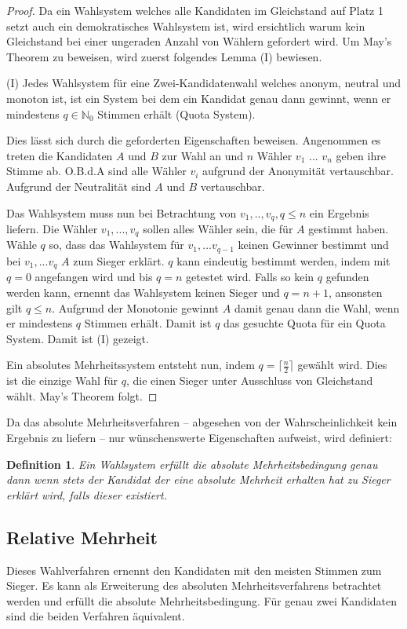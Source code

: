 \documentclass[BCOR5mm,DIV12,a4paper,10pt]{scrartcl}
\newtheorem{definition}[lemma]{Definition} %
\begin{document}
\begin{proof}
Da ein Wahlsystem welches alle Kandidaten im Gleichstand auf Platz 1 setzt auch ein demokratisches Wahlsystem ist, wird ersichtlich warum kein Gleichstand bei einer ungeraden Anzahl von Wählern gefordert wird. Um May's Theorem zu beweisen, wird zuerst folgendes Lemma (I) bewiesen.


(I) Jedes Wahlsystem für eine Zwei-Kandidatenwahl welches anonym, neutral und monoton ist, ist ein System bei dem ein Kandidat genau dann gewinnt, wenn er mindestens $q \in \mathbb{N}_0$ Stimmen erhält (Quota System).

Dies lässt sich durch die geforderten Eigenschaften beweisen. Angenommen es treten die Kandidaten $A$ und $B$ zur Wahl an und $n$ Wähler $v_1$ ... $v_n$ geben ihre Stimme ab. O.B.d.A sind alle Wähler $v_i$ aufgrund der Anonymität vertauschbar. Aufgrund der Neutralität sind $A$ und $B$ vertauschbar.

Das Wahlsystem muss nun bei Betrachtung von $v_1, .., v_q, q \leq n$ ein Ergebnis liefern. Die Wähler $v_1, ..., v_q$ sollen alles Wähler sein, die für $A$ gestimmt haben. Wähle $q$ so, dass das Wahlsystem für $v_1, ... v_{q-1}$ keinen Gewinner bestimmt und bei $v_1, ... v_q$ $A$ zum Sieger erklärt. $q$ kann eindeutig bestimmt werden, indem mit $q=0$ angefangen wird und bis $q=n$ getestet wird. Falls so kein $q$ gefunden werden kann, ernennt das Wahlsystem keinen Sieger und $q=n+1$, ansonsten gilt $q \leq n$. Aufgrund der Monotonie gewinnt $A$ damit genau dann die Wahl, wenn er mindestens $q$ Stimmen erhält. Damit ist $q$ das gesuchte Quota für ein Quota System. Damit ist (I) gezeigt.

Ein absolutes Mehrheitssystem entsteht nun, indem $q = \lceil \frac{n}{2} \rceil$ gewählt wird. Dies ist die einzige Wahl für $q$, die einen Sieger unter Ausschluss von Gleichstand wählt. May's Theorem folgt.
\end{proof}

Da das absolute Mehrheitsverfahren -- abgesehen von der Wahrscheinlichkeit kein Ergebnis zu liefern -- nur wünschenswerte Eigenschaften aufweist, wird definiert:
\begin{definition}
Ein Wahlsystem erfüllt die absolute Mehrheitsbedingung genau dann wenn stets der Kandidat der eine absolute Mehrheit erhalten hat zu Sieger erklärt wird, falls dieser existiert.
\end{definition}

\subsection{Relative Mehrheit}
\label{relativemehrheit}
Dieses Wahlverfahren ernennt den Kandidaten mit den meisten Stimmen zum Sieger. Es kann als Erweiterung des absoluten Mehrheitsverfahrens betrachtet werden und erfüllt die absolute Mehrheitsbedingung. Für genau zwei Kandidaten sind die beiden Verfahren äquivalent.
\end{document}
